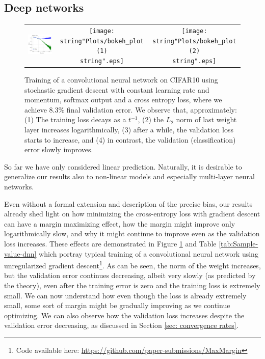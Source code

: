 \documentclass[twoside,11pt,english]{article}
\begin{document}
\subsection{Deep networks}


\begin{figure}
\begin{centering}
\begin{tabular}{ccc}
\includegraphics[width=0.31\columnwidth]{Plots/bokeh_plot}  & \texttt{[image: \\string"Plots/bokeh\_plot (1)\\string".eps]}  & \texttt{[image: \\string"Plots/bokeh\_plot (2)\\string".eps]}\tabularnewline
\end{tabular}
\par\end{centering}
\caption{Training of a convolutional neural network on CIFAR10 using stochastic
gradient descent with constant learning rate and momentum, softmax
output and a cross entropy loss, where we achieve $8.3\%$ final validation
error. We observe that, approximately: (1) The training loss decays
as a $t^{-1}$, (2) the $L_{2}$ norm of last weight layer increases
logarithmically, (3) after a while, the validation loss starts to
increase, and (4) in contrast, the validation (classification) error
slowly improves. \label{fig: DNN results}}
\end{figure}


So far we have only considered linear prediction. Naturally, it is
desirable to generalize our results also to non-linear models and
especially multi-layer neural networks.

Even without a formal extension and description of the precise bias,
our results already shed light on how minimizing the cross-entropy
loss with gradient descent can have a margin maximizing effect, how
the margin might improve only logarithmically slow, and why it might
continue to improve even as the validation loss increases. These effects
are demonstrated in Figure \ref{fig: DNN results} and Table \ref{tab:Sample-value-dnn}
which portray typical training of a convolutional neural network using
unregularized gradient descent\footnote{Code available here: \url{ https://github.com/paper-submissions/MaxMargin}}.
As can be seen, the norm of the weight increases, but the validation
error continues decreasing, albeit very slowly (as predicted by the
theory), even after the training error is zero and the training loss
is extremely small. We can now understand how even though the loss
is already extremely small, some sort of margin might be gradually
improving as we continue optimizing. We can also observe how the validation
loss increases despite the validation error decreasing, as discussed
in Section \ref{sec: convergence rates}.
\end{document}
